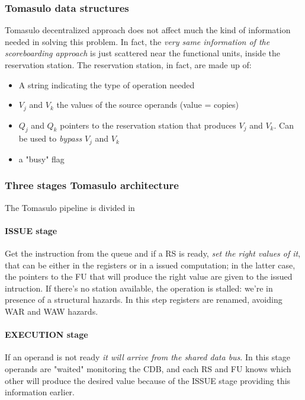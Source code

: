 \documentclass[10pt,a4paper]{article}
\begin{document}
				\subsubsection{Tomasulo data structures}
					Tomasulo decentralized approach does not affect much the kind of information needed in solving this problem. In fact, the \emph{very same information of the scoreboarding approach} is just scattered near the functional units, inside the reservation station. The reservation station, in fact, are made up of:
					\begin{itemize}
						\item A string indicating the type of operation needed
						\item $V_j$ and $V_k$ the values of the source operands (value = copies)
						\item $Q_j$ and $Q_k$ pointers to the reservation station that produces $V_j$ and $V_k$. Can be used to \emph{bypass} $V_j$ and $V_k$ 
						\item a "busy" flag
					\end{itemize}
					
			 	\subsubsection{Three stages Tomasulo architecture}
					The Tomasulo pipeline is divided in
					
					\paragraph{ISSUE stage}
						Get the instruction from the queue and if a RS is ready, \emph{set the right values of it}, that can be either in the registers or in a issued computation; in the latter case, the pointers to the FU that will produce the right value are given to the issued intruction. If there's no station available, the operation is stalled: we're in presence of a structural hazards. In this step registers are renamed, avoiding WAR and WAW hazards.
					
					\paragraph{EXECUTION stage}
						If an operand is not ready \emph{it will arrive from the shared data bus}. In this stage operands are "waited" monitoring the CDB, and each RS and FU knows which other will produce the desired value because of the ISSUE stage providing this information earlier.
						
\end{document}
